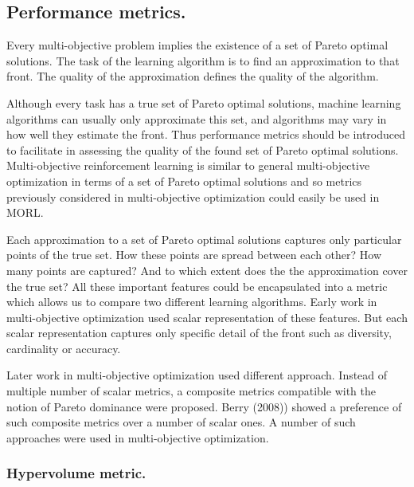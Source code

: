 \subsection{Performance metrics.}
\label{sec:performance-metrics}
Every multi-objective problem implies the existence of a set of Pareto optimal solutions. The task of the learning algorithm is to find an approximation to that front. The quality of the approximation defines the quality of the algorithm.

Although every task has a true set of Pareto optimal solutions, machine learning algorithms can usually only approximate this set, and algorithms may vary in how well they estimate the front. Thus performance metrics should be introduced to facilitate in assessing the quality of the found set of Pareto optimal solutions.  Multi-objective reinforcement learning is similar to general multi-objective optimization in terms of a set of Pareto optimal solutions and so metrics previously considered in multi-objective optimization could easily be used in MORL.

Each approximation to a set of Pareto optimal solutions captures only particular points of the true set. How these points are spread between each other? How many points are captured? And to which extent does the the approximation cover the true set? All these important features could be encapsulated into a metric which allows us to compare two different learning algorithms. Early work in multi-objective optimization used scalar representation of these features. But each scalar representation captures only specific detail of the front such as diversity, cardinality or accuracy.

Later work in multi-objective optimization used different approach. Instead of multiple number of scalar metrics, a composite metrics compatible with the notion of Pareto dominance were proposed. Berry (2008)\nocite{berry2008phd}) showed a preference of such composite metrics over a number of scalar ones. A number of such approaches were used in multi-objective optimization.

\subsubsection{Hypervolume metric.}

